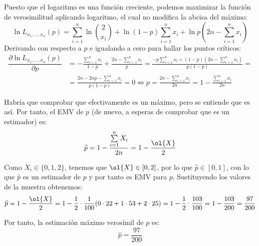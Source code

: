 \begin{ejercicio}
\begin{description}
        Puesto que el logaritmo es una función creciente, podemos maximizar la función de verosimilitud aplicando logaritmo, el cual no modifica la abcisa del máximo:
        \begin{equation*}
            \ln L_{x_1,\ldots,x_n}(p) = \sum_{i=1}^{n}\ln\binom{2}{x_i} + \ln(1-p)\sum_{i=1}^{n}x_i + \ln p\left(2n-\sum_{i=1}^{n}x_i\right)
        \end{equation*}
        Derivando con respecto a $p$ e igualando a cero para hallar los puntos críticos:
        \begin{align*}
            \dfrac{\partial \ln L_{x_1,\ldots,x_n}(p)}{\partial p} &= -\frac{\sum\limits_{i=1}^{n}x_i}{1-p} + \frac{2n-\sum\limits_{i=1}^{n}x_i}{p} = \frac{-p\sum\limits_{i=1}^{n}x_i + (1-p)(2n-\sum\limits_{i=1}^{n}x_i)}{p(1-p)}
            =\\&= \frac{2n - 2np - \sum\limits_{i=1}^{n}x_i}{p(1-p)} = 0 \Longleftrightarrow p = \frac{2n-\sum\limits_{i=1}^{n}x_i}{2n} = 1-\frac{\sum\limits_{i=1}^{n}x_i}{2n}
        \end{align*}

        Habría que comprobar que efectivamente es un máximo, pero se entiende que es así. Por tanto, el EMV de $p$ (de nuevo, a esperas de comprobar que es un estimador) es:
        \begin{equation*}
            \widehat{p} = 1-\frac{\sum\limits_{i=1}^{n}X_i}{2n} = 1-\frac{\ol{X}}{2}
        \end{equation*}

        Como $X_i\in \{0,1,2\}$, tenemos que $\ol{X}\in [0,2]$, por lo que $\widehat{p}\in [0,1]$, con lo que $\widehat{p}$ es un estimador de $p$ y por tanto es EMV para $p$. Sustituyendo los valores de la muestra obtenemos:
        \begin{equation*}
            \widehat{p} = 1-\frac{\ol{X}}{2} = 1-\frac{1}{2}\cdot \frac{1}{100}(0\cdot 22 + 1\cdot 53 + 2\cdot 25) = 1-\frac{1}{2}\cdot \frac{103}{100} = 1-\frac{103}{200} = \frac{97}{200}
        \end{equation*}

        Por tanto, la estimación máximo verosímil de $p$ es:
        \begin{equation*}
            \widehat{p} = \frac{97}{200}
        \end{equation*}
    \end{description}
\end{ejercicio}

